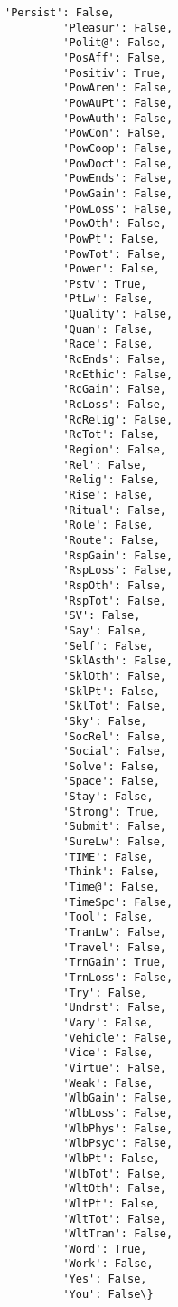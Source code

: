 \documentclass[11pt]{article}
\begin{document}
\begin{Verbatim}[commandchars=\\\{\}]
         'Persist': False,
         'Pleasur': False,
         'Polit@': False,
         'PosAff': False,
         'Positiv': True,
         'PowAren': False,
         'PowAuPt': False,
         'PowAuth': False,
         'PowCon': False,
         'PowCoop': False,
         'PowDoct': False,
         'PowEnds': False,
         'PowGain': False,
         'PowLoss': False,
         'PowOth': False,
         'PowPt': False,
         'PowTot': False,
         'Power': False,
         'Pstv': True,
         'PtLw': False,
         'Quality': False,
         'Quan': False,
         'Race': False,
         'RcEnds': False,
         'RcEthic': False,
         'RcGain': False,
         'RcLoss': False,
         'RcRelig': False,
         'RcTot': False,
         'Region': False,
         'Rel': False,
         'Relig': False,
         'Rise': False,
         'Ritual': False,
         'Role': False,
         'Route': False,
         'RspGain': False,
         'RspLoss': False,
         'RspOth': False,
         'RspTot': False,
         'SV': False,
         'Say': False,
         'Self': False,
         'SklAsth': False,
         'SklOth': False,
         'SklPt': False,
         'SklTot': False,
         'Sky': False,
         'SocRel': False,
         'Social': False,
         'Solve': False,
         'Space': False,
         'Stay': False,
         'Strong': True,
         'Submit': False,
         'SureLw': False,
         'TIME': False,
         'Think': False,
         'Time@': False,
         'TimeSpc': False,
         'Tool': False,
         'TranLw': False,
         'Travel': False,
         'TrnGain': True,
         'TrnLoss': False,
         'Try': False,
         'Undrst': False,
         'Vary': False,
         'Vehicle': False,
         'Vice': False,
         'Virtue': False,
         'Weak': False,
         'WlbGain': False,
         'WlbLoss': False,
         'WlbPhys': False,
         'WlbPsyc': False,
         'WlbPt': False,
         'WlbTot': False,
         'WltOth': False,
         'WltPt': False,
         'WltTot': False,
         'WltTran': False,
         'Word': True,
         'Work': False,
         'Yes': False,
         'You': False\}
\end{Verbatim}
            
\end{document}
